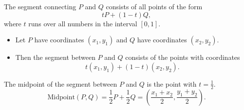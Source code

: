 \begin{frame}
\begin{observation}The segment connecting $P$ and $Q$ consists of all points of the form 
\[
t P+(1-t)Q,
\]
where $t$ runs over all numbers in the interval $[0,1]$.
\end{observation}
\begin{itemize}
\item Let $P$  have coordinates $(x_1, y_1)$ and $Q$ have coordinates $(x_2, y_2)$.

\item Then the segment between $P$ and $Q$ consists of the points with coordinates
\[
t(x_1, y_1)+(1-t)(x_2, y_2).
\]
\end{itemize}
\begin{observation}
The midpoint of the segment between $P$ and $Q$ is the point with $t=\frac{1}{2}$.
\[
\text{Midpoint}(P,Q)= \frac{1}{2}P+\frac{1}{2}Q=\left( \frac{x_1+x_2}{2}, \frac{y_1+y_2}{2} \right).
\]
\end{observation}
\end{frame}